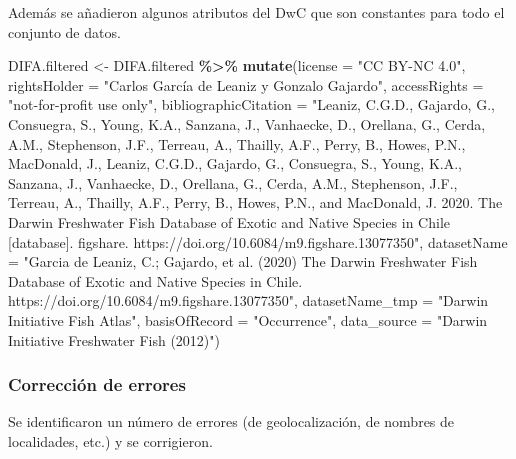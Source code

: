 \documentclass[sn-apa,pdflatex]{sn-jnl}
\newenvironment{Shaded}{\begin{snugshade}}{\end{snugshade}}
\newcommand{\AttributeTok}[1]{\textcolor[rgb]{0.13,0.29,0.53}{#1}}
\newcommand{\FunctionTok}[1]{\textcolor[rgb]{0.13,0.29,0.53}{\textbf{#1}}}
\newcommand{\NormalTok}[1]{#1}
\newcommand{\OtherTok}[1]{\textcolor[rgb]{0.56,0.35,0.01}{#1}}
\newcommand{\SpecialCharTok}[1]{\textcolor[rgb]{0.81,0.36,0.00}{\textbf{#1}}}
\newcommand{\StringTok}[1]{\textcolor[rgb]{0.31,0.60,0.02}{#1}}
\begin{document}
Además se añadieron algunos atributos del DwC que son constantes para
todo el conjunto de datos.

\begin{Shaded}
\begin{Highlighting}[]
\NormalTok{DIFA.filtered }\OtherTok{\textless{}{-}}\NormalTok{ DIFA.filtered }\SpecialCharTok{\%\textgreater{}\%}
    \FunctionTok{mutate}\NormalTok{(}\AttributeTok{license =} \StringTok{"CC BY{-}NC 4.0"}\NormalTok{, }\AttributeTok{rightsHolder =} \StringTok{"Carlos García de Leaniz y Gonzalo Gajardo"}\NormalTok{,}
        \AttributeTok{accessRights =} \StringTok{"not{-}for{-}profit use only"}\NormalTok{, }\AttributeTok{bibliographicCitation =} \StringTok{"Leaniz, C.G.D., Gajardo, G., Consuegra, S., Young, K.A., Sanzana, J., Vanhaecke, D., Orellana, G., Cerda, A.M., Stephenson, J.F., Terreau, A., Thailly, A.F., Perry, B., Howes, P.N., MacDonald, J., Leaniz, C.G.D., Gajardo, G., Consuegra, S., Young, K.A., Sanzana, J., Vanhaecke, D., Orellana, G., Cerda, A.M., Stephenson, J.F., Terreau, A., Thailly, A.F., Perry, B., Howes, P.N., and MacDonald, J. 2020. The Darwin Freshwater Fish Database of Exotic and Native Species in Chile [database]. figshare. https://doi.org/10.6084/m9.figshare.13077350"}\NormalTok{,}
        \AttributeTok{datasetName =} \StringTok{"Garcia de Leaniz, C.; Gajardo, et al. (2020) The Darwin Freshwater Fish Database of Exotic and Native Species in Chile. https://doi.org/10.6084/m9.figshare.13077350"}\NormalTok{,}
        \AttributeTok{datasetName\_tmp =} \StringTok{"Darwin Initiative Fish Atlas"}\NormalTok{, }\AttributeTok{basisOfRecord =} \StringTok{"Occurrence"}\NormalTok{,}
        \AttributeTok{data\_source =} \StringTok{"Darwin Initiative Freshwater Fish (2012)"}\NormalTok{)}
\end{Highlighting}
\end{Shaded}

\subsubsection{Corrección de errores}\label{correcciuxf3n-de-errores-1}

Se identificaron un número de errores (de geolocalización, de nombres de
localidades, etc.) y se corrigieron.
\end{document}
